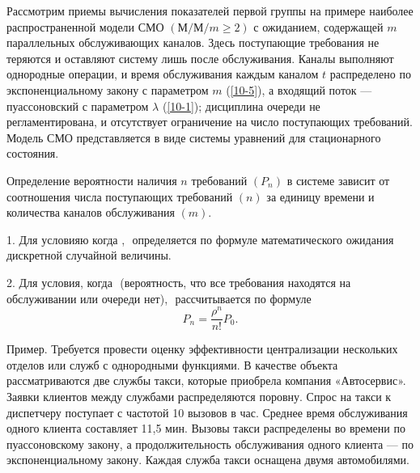 Рассмотрим приемы вычисления показателей первой группы на примере наиболее распространенной модели СМО $(М/М/m \geq 2)$ с ожиданием, содержащей $m$ параллельных обслуживающих каналов. Здесь поступающие требования не теряются и оставляют систему лишь после обслуживания. Каналы выполняют однородные операции, и время обслуживания каждым каналом $t$ распределено по экспоненциальному закону с параметром $m$ (\ref{10-5}), а входящий поток — пуассоновский с параметром $\lambda$ (\ref{10-1}); дисциплина очереди не регламентирована, и отсутствует ограничение на число поступающих требований. Модель СМО представляется в виде системы уравнений для стационарного состояния.

Определение вероятности наличия $n$ требований $(P_n)$ в системе зависит от соотношения числа поступающих требований $(n)$  за единицу времени  и количества каналов обслуживания $(m)$.

1. Для условияю когда $  $, $  $ определяется по формуле математического ожидания дискретной случайной величины.

2. Для условия, когда $  $ (вероятность, что все требования находятся на обслуживании или очереди нет), $  $ рассчитывается по формуле
\begin{equation}\label{10-8}
P_n = \dfrac{\rho^n}{n!}P_0.
\end{equation}

































Пример. Требуется провести оценку эффективности централизации нескольких отделов или служб с однородными функциями. В качестве объекта рассматриваются две службы такси, которые приобрела компания «Автосервис». Заявки клиентов между службами распределяются поровну. Спрос на такси к диспетчеру поступает с частотой 10 вызовов в час. Среднее время обслуживания одного клиента составляет 11,5 мин. Вызовы такси распределены во времени по пуассоновскому закону, а продолжительность обслуживания одного клиента — по экспоненциальному закону. Каждая служба такси оснащена двумя автомобилями.

